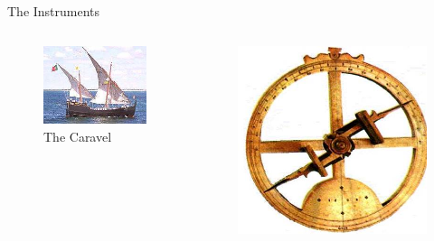\documentclass{beamer}
\begin{document}
\begin{frame}{The Instruments}

\begin{columns}
	\begin{figure}[ht]
	\begin{center}
	\includegraphics[width=0.9 \columnwidth]{Caravel.jpg}
	\caption{\tiny The Caravel}	
	\end{center}
	\end{figure}
	\begin{figure}[ht]
	\begin{center}
	\includegraphics[width=0.9 \columnwidth]{Astrolab.jpg}

\end{center}
\end{figure}
\end{columns}
\end{frame}
\end{document}
